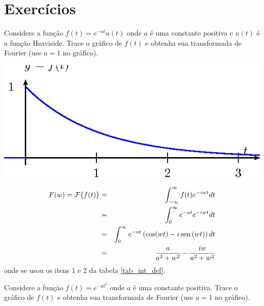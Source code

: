 \section{Exercícios}
\begin{Exercise}{\label{transf_exp_heav}} Considere a função $f(t)=e^{-at}u(t)$ onde $a$ é uma constante positiva e $u(t)$ é a função Heaviside. Trace o gráfico de $f(t)$ e obtenha sua transformada de Fourier  (use $a=1$ no gráfico).
\end{Exercise}
\begin{Answer}
\begin{center}

\includegraphics{cap_transformada_de_fourier/pics/figura_8}\end{center}
\begin{eqnarray*}
F(w)=\mathcal{F}\{f(t)\}&=&\int_{-\infty}^\infty f(t) e^{-i w t}dt\\
&=&\int_{0}^\infty e^{-at} e^{-i w t}dt\\
&=&\int_{0}^\infty e^{-at} \left(\cos(wt)-i\operatorname{sen}\,(wt)\right)dt\\
&=&\frac{a}{a^2+w^2}-\frac{iw}{a^2+w^2}\\
\end{eqnarray*}
onde se usou os itens 1 e 2 da tabela \ref{tab_int_def}.
\end{Answer}
\begin{Exercise}{\label{Exer_trans_exp_t2}} Considere a função $f(t)=e^{-at^2}$ onde $a$ é uma constante positiva. Trace o gráfico de $f(t)$ e obtenha sua transformada de Fourier (use $a=1$ no gráfico).
\end{Exercise}

